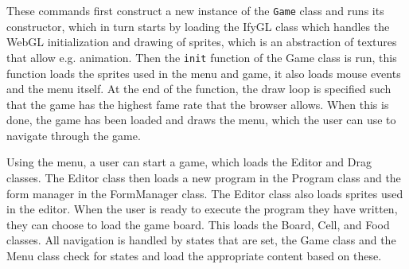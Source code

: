 These commands first construct a new instance of the \texttt{Game} class and runs its constructor, which in turn starts by loading the IfyGL class which handles the WebGL initialization and drawing of sprites, which is an abstraction of textures that allow e.g. animation. Then the \texttt{init} function of the Game class is run, this function loads the sprites used in the menu and game, it also loads mouse events and the menu itself. At the end of the function, the draw loop is specified such that the game has the highest fame rate that the browser allows.
When this is done, the game has been loaded and draws the menu, which the user can use to navigate through the game.\newline

Using the menu, a user can start a game, which loads the Editor and Drag classes. The Editor class then loads a new program in the Program class and the form manager in the FormManager class. The Editor class also loads sprites used in the editor. When the user is ready to execute the program they have written, they can choose to load the game board. This loads the Board, Cell, and Food classes. All navigation is handled by states that are set, the Game class and the Menu class check for states and load the appropriate content based on these.